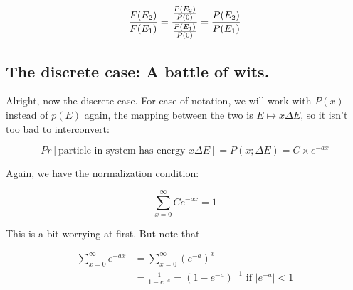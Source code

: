 \documentclass[letterpaper,12pt]{report}
\begin{document}
\[\frac{F(E_2)}{F(E_1)} = \frac{\frac{P(E_2)}{P(0)}}{\frac{P(E_1)}{P(0)}} \\
            = \frac{P(E_2)}{P(E_1)}\]









\subsection*{The discrete case: A battle of wits.}

Alright, now the discrete case. For ease of notation, we will work with \(P(x)\) instead of
\(p(E)\) \textemdash{} again, the mapping between the two is \(E \mapsto x\Delta E\), so it
isn't too bad to interconvert:

\[Pr[\text{particle in system has energy }x\Delta E] = P(x; \Delta E) = C\times e^{-ax} \]

Again, we have the normalization condition:

\[\sum_{x=0}^{\infty} Ce^{-ax} = 1 \]

This is a bit worrying at first. But note that

\[\begin{split}
  \sum_{x=0}^{\infty} e^{-ax} &= \sum_{x=0}^{\infty} \left(e^{-a}\right)^x \\
                      &= \frac{1}{1 - e^{-a}} = (1 - e^{-a})^{-1} \text{ if } \left|e^{-a}\right| < 1
\end{split}
\]
\end{document}
